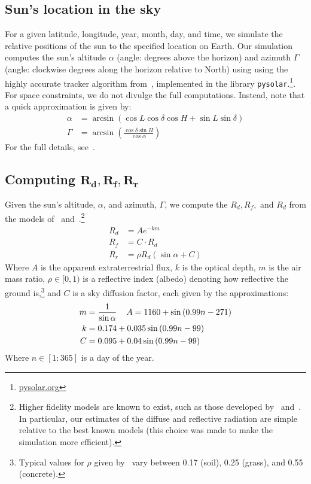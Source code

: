 \documentclass{article}
\begin{document}
\subsection{Sun's location in the sky}
For a given latitude, longitude, year, month, day, and time, we simulate the relative positions of the sun to the specified location on Earth. Our simulation computes the sun's altitude $\alpha$ (angle: degrees above the horizon) and azimuth $\Gamma$ (angle: clockwise degrees along the horizon relative to North) using using the highly accurate tracker algorithm from~\citet{reda2004solar}, implemented in the library \texttt{pysolar}.\footnote{\url{pysolar.org}}. For space constraints, we do not divulge the full computations. Instead, note that a quick approximation is given by:
\begin{align}
\alpha &= \arcsin(\cos L \cos \delta \cos H + \sin L \sin \delta)\\
\Gamma &= \arcsin\left(\frac{\cos \delta \sin H}{\cos \alpha}\right)
\end{align}
For the full details, see~\citet{reda2004solar}.

\subsection{Computing $\pmb{R_d, R_f, R_r}$}
Given the sun's altitude, $\alpha$, and azimuth, $\Gamma$, we compute the $R_d, R_f,$ and $R_d$ from the models of~\citet{threlkeld1957direct,Liu1960} and~\citet{masters2013renewable}.\footnote{Higher fidelity models are known to exist, such as those developed by~\citet{andersen1980comments,klein1977calculation} and~\citet{kamali2006estimating}. In particular, our estimates of the diffuse and reflective radiation are simple relative to the best known models (this choice was made to make the simulation more efficient).}
\begin{align}
R_d &= A e^{-km} \\
R_f &= C \cdot R_d \\
R_r &= \rho R_d (\sin \alpha + C)
\end{align}
Where $A$ is the apparent extraterrestrial flux, $k$ is the optical depth, $m$ is the air mass ratio, $\rho \in [0,1)$ is a reflective index (albedo) denoting how reflective the ground is,\footnote{Typical values for $\rho$ given by~\citet{mcevoy2003practical} vary between 0.17 (soil), 0.25 (grass), and 0.55 (concrete).} and $C$ is a sky diffusion factor, each given by the approximations:
\begin{align}
m&=\frac{1}{\sin \alpha} \hspace{4mm} A = 1160 + \sin \left(0.99 n- 271\right)\\
k&=0.174 + 0.035 \sin\left( 0.99 n - 99\right)\\
C&=0.095 + 0.04 \sin\left(0.99 n-99\right)
\end{align}
Where $n \in [1:365]$ is a day of the year.
\end{document}
